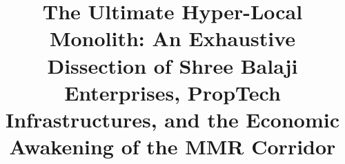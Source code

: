 \documentclass[conference, a4paper]{IEEEtran}
\begin{document}
\title{The Ultimate Hyper-Local Monolith: An Exhaustive Dissection of Shree Balaji Enterprises, PropTech Infrastructures, and the Economic Awakening of the MMR Corridor\\
}

\author{
}

\maketitle







\end{document}
